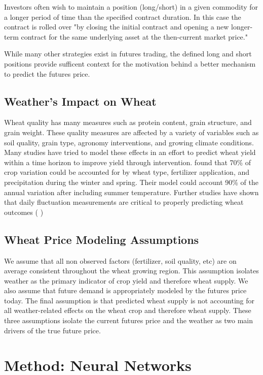 \documentclass[twoside,11pt]{article}
\begin{document}
  Investors often wish to maintain a position (long/short) in a given commodity for a longer period of time than the specified contract duration. In this case the contract is rolled over "by closing the initial contract and opening a new longer-term contract for the same underlying asset at the then-current market price." \cite{InvestopediaRF}

  While many other strategies exist in futures trading, the defined long and short positions provide sufficent context for the motivation behind a better mechanism to predict the futures price.
 
\subsection{Weather's Impact on Wheat}
	
	Wheat quality has many measures such as protein content, grain structure, and grain weight. These quality measures are affected by a variety of variables such as soil quality, grain type, agronomy interventions, and growing climate conditions. Many studies have tried to model these effects in an effort to predict wheat yield within a time horizon to improve yield through intervention. \cite{Gooding2017} found that 70\% of crop variation could be accounted for by wheat type, fertilizer application, and precipitation during the winter and spring. Their model could account 90\% of the annual variation after including summer temperature. Further studies have shown that daily fluctuation measurements are critical to properly predicting wheat outcomes (\cite{Nuttall2017} \cite{Mearns1996})
	
\subsection{Wheat Price Modeling Assumptions}
We assume that all non observed factors (fertilizer, soil quality, etc) are on average consistent throughout the wheat growing region. This assumption isolates weather as the primary indicator of crop yield and therefore wheat supply. We also assume that future demand is appropriately modeled by the futures price today. The final assumption is that predicted wheat supply is not accounting for all weather-related effects on the wheat crop and therefore wheat supply. These three assumptions isolate the current futures price and the weather as two main drivers of the true future price. 
	

\section{Method: Neural Networks} \label{model}
\end{document}
